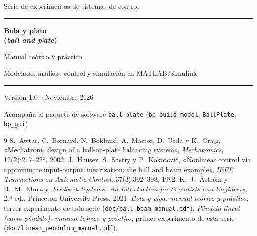 \documentclass[11pt,a4paper,openany]{report}
\newcounter{practica}
\newcommand{\code}[1]{\texttt{#1}}
\begin{document}
\begin{titlepage}
\centering
\vspace*{1.2cm}
{\large Serie de experimentos de sistemas de control\par}
\vspace{0.4cm}
{\color{c1}\rule{\linewidth}{1.2pt}\par}
\vspace{0.4cm}
{\Huge\bfseries Bola y plato\\[0.2em] (\emph{ball and plate})\par}
\vspace{0.4cm}
{\Large Manual teórico y práctico\par}
\vspace{0.2cm}
{\large Modelado, análisis, control y simulación en MATLAB/Simulink\par}
{\color{c1}\rule{\linewidth}{1.2pt}\par}
\vspace{1.0cm}

\vfill
{\large Versión 1.0 \quad·\quad Noviembre 2026\par}
\vspace{0.6cm}
{\small Acompaña al paquete de software \code{ball\_plate} (\code{bp\_build\_model}, \code{BallPlate}, \code{bp\_gui}).\par}
\end{titlepage}

\tableofcontents
\listoffigures










\appendix


\begin{thebibliography}{9}
 S.~Awtar, C.~Bernard, N.~Boklund, A.~Master, D.~Ueda y K.~Craig, «Mechatronic design of a ball-on-plate balancing system», \emph{Mechatronics}, 12(2):217--228, 2002.
 J.~Hauser, S.~Sastry y P.~Kokotović, «Nonlinear control via approximate input-output linearization: the ball and beam example», \emph{IEEE Transactions on Automatic Control}, 37(3):392--398, 1992.
 K.~J.~Åström y R.~M.~Murray, \emph{Feedback Systems: An Introduction for Scientists and Engineers}, 2.ª ed., Princeton University Press, 2021.
 \emph{Bola y viga: manual teórico y práctico}, tercer experimento de esta serie (\code{doc/ball\_beam\_manual.pdf}).
 \emph{Péndulo lineal (carro-péndulo): manual teórico y práctico}, primer experimento de esta serie (\code{doc/linear\_pendulum\_manual.pdf}).
\end{thebibliography}
\end{document}
